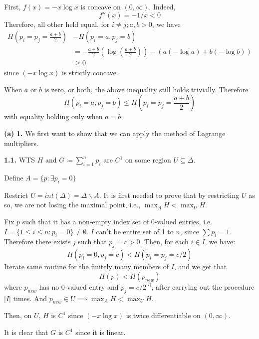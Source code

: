 \documentclass[a4paper, 12pt]{article}
\begin{document}
\begin{solution}
    First, $f(x) = -x \log x$ is concave on $(0, \infty)$. Indeed, \[
        f''(x) = -1/x < 0
    \]
    Therefore, all other held equal, for $i \neq j; a, b > 0$, we have
    \begin{align*}
        H\left(p_i = p_j = \frac{a+b}{2}\right) & - H(p_i = a, p_j = b)                                                                                 \\
                                                & = -\frac{a+b}{2}  \left(\log\left(\frac{a+b}{2}\right)\right) - \left(a (-\log a) + b(-\log b)\right) \\
                                                & \geq 0
    \end{align*}
    since $(-x \log x)$ is strictly concave.

    When $a$ or $b$ is zero, or both, the above inequality still holds trivially. Therefore \[
        H(p_i = a, p_j = b) \leq H\left(p_i = p_j = \frac{a+b}{2}\right)
    \]
    with equality holding only when $a = b$.

    \textbf{(a)} \textbf{1.} We first want to show that we can apply the method of Lagrange multipliers.

    \textbf{1.1.} WTS $H$ and $G \coloneqq \sum_{i=1}^{n} p_i$ are $C^1$ on some region $U \subseteq \Delta$.

    Define $A = \{p : \exists p_i = 0\}$

    Restrict $U = int(\Delta) = \Delta \backslash A$. It is first needed to prove that by restricting $U$ as so, we are not losing the maximal point, i.e., $\max_{A} H < \max_{U} H$.

    Fix $p$ such that it has a non-empty index set of 0-valued entries, i.e. $I = \{ 1 \leq i \leq n : p_i = 0 \} \neq \emptyset$. $I$ can't be entire set of 1 to $n$, since $\sum p_i = 1$. Therefore there exists $j$ such that $p_j = c > 0$. Then, for each $i \in I$, we have: \[
        H(p_i = 0, p_j = c) < H(p_i = p_j = c/2)
    \]
    Iterate same routine for the finitely many members of $I$, and we get that \[
        H(p) < H(p_{new})
    \]
    where $p_{new}$ has no 0-valued entry and $p_j = c/2^{|I|}$, after carrying out the procedure $|I|$ times. And $p_{new} \in U \implies \max_{A} H < \max_{U} H$.

    Then, on $U$, $H$ is $C^1$ since $(-x \log x)$ is twice differentiable on $(0, \infty)$.

    It is clear that $G$ is $C^1$ since it is linear.


\end{solution}
\end{document}
